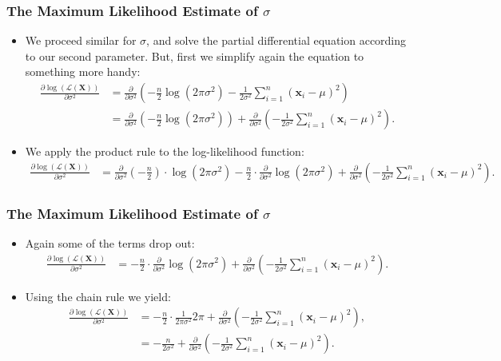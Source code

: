 \begin{frame}
  \frametitle{The Maximum Likelihood Estimate of $\sigma$}
  \begin{itemize}
  \item We proceed similar for $\sigma$, and solve the partial differential equation according to our second parameter. But, first we simplify again the equation to something more handy:
    \begin{align}
      \frac{\partial \log\left(\mathcal{L}(\mathbf{X})\right)}{\partial \sigma^2} &= \frac{\partial}{\partial\sigma^2} \left(-\frac{n}{2} \log\left(2\pi\sigma^2\right) - \frac{1}{2\sigma^2} \sum_{i=1}^{n} (\mathbf{x}_i-\mu)^2 \right)\\
                                                                                  &= \frac{\partial}{\partial\sigma^2} \left(-\frac{n}{2} \log\left(2\pi\sigma^2\right)\right) + \frac{\partial}{\partial\sigma^2}\left(-\frac{1}{2\sigma^2} \sum_{i=1}^{n} (\mathbf{x}_i-\mu)^2 \right).
    \end{align}
  \item We apply the product rule to the log-likelihood function:
    \begin{align*}
      \frac{\partial \log\left(\mathcal{L}(\mathbf{X})\right)}{\partial \sigma^2} &= \frac{\partial}{\partial\sigma^2}(-\frac{n}{2}) \cdot \log\left(2\pi\sigma^2\right) - \frac{n}{2} \cdot \frac{\partial}{\partial\sigma^2} \log\left(2\pi\sigma^2\right) + \frac{\partial}{\partial\sigma^2}\left( -\frac{1}{2\sigma^2} \sum_{i=1}^{n} (\mathbf{x}_i-\mu)^2 \right).
    \end{align*}
  \end{itemize}
\end{frame}



\begin{frame}
  \frametitle{The Maximum Likelihood Estimate of $\sigma$}
  \begin{itemize}
  \item Again some of the terms drop out:
    \begin{align}
      \frac{\partial \log\left(\mathcal{L}(\mathbf{X})\right)}{\partial \sigma^2} &= - \frac{n}{2} \cdot \frac{\partial}{\partial\sigma^2} \log\left(2\pi\sigma^2\right) + \frac{\partial}{\partial\sigma^2}\left( -\frac{1}{2\sigma^2} \sum_{i=1}^{n} (\mathbf{x}_i-\mu)^2 \right).
    \end{align}
  \item Using the chain rule we yield:
    \begin{align}
      \frac{\partial \log\left(\mathcal{L}(\mathbf{X})\right)}{\partial \sigma^2} &= - \frac{n}{2} \cdot \frac{1}{2\pi\sigma^2} 2\pi + \frac{\partial}{\partial\sigma^2}\left( -\frac{1}{2\sigma^2} \sum_{i=1}^{n} (\mathbf{x}_i-\mu)^2 \right),\\
                                                                                  &= - \frac{n}{2\sigma^2} + \frac{\partial}{\partial\sigma^2}\left( -\frac{1}{2\sigma^2} \sum_{i=1}^{n} (\mathbf{x}_i-\mu)^2 \right).
    \end{align}
  \end{itemize}
\end{frame}


